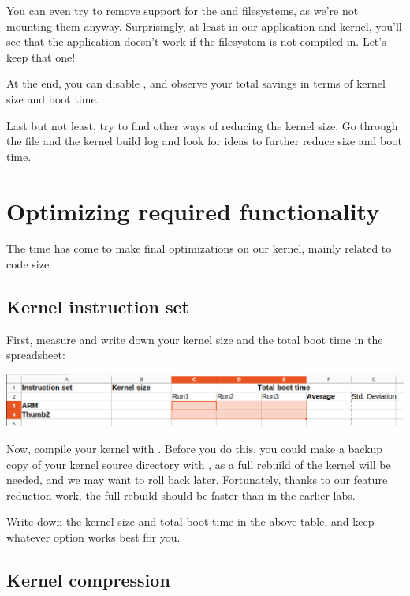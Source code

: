 You can even try to remove support for the  and 
filesystems, as we're not mounting them anyway. Surprisingly, at least
in our application and kernel, you'll see that the application doesn't
work if the  filesystem is not compiled in. Let's keep that
one!

At the end, you can disable , and observe your
total savings in terms of kernel size and boot time.

Last but not least, try to find other ways of reducing the kernel size.
Go through the  file and the kernel build log and look for
ideas to further reduce size and boot time.

\section{Optimizing required functionality}

The time has come to make final optimizations on our kernel, mainly
related to code size.

\subsection{Kernel instruction set}

First, measure and write down your kernel size and the total boot time
in the  spreadsheet:

\includegraphics[width=\textwidth]{labs/boot-time-kernel/kernel-size-arm-thumb2.png}

Now, compile your kernel with . Before you do
this, you could make a backup copy of your kernel source directory with
, as a full rebuild of the kernel will be needed, and we
may want to roll back later. Fortunately, thanks to our feature
reduction work, the full rebuild should be faster than in the earlier labs.

Write down the kernel size and total boot time in the above table,
and keep whatever option works best for you.

\subsection{Kernel compression}

